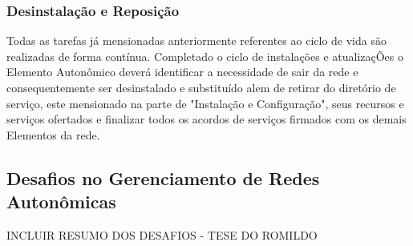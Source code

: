 \documentclass[11pt,twoside]{article}
\begin{document}
\subsubsection{Desinstalação e Reposição}
Todas as tarefas já mensionadas anteriormente referentes ao ciclo de vida são realizadas de forma contínua. Completado o ciclo de instalações e atualizaçÕes o Elemento Autonômico deverá identificar a necessidade de sair da rede e consequentemente ser desinstalado e substituído alem de retirar do diretório de serviço, este mensionado na parte de "Instalação e Configuração", seus recursos e serviços ofertados e finalizar todos os acordos de serviços firmados com os demais Elementos da rede.

\subsection{Desafios no Gerenciamento de Redes Autonômicas}
INCLUIR RESUMO DOS DESAFIOS - TESE DO ROMILDO
\end{document}
